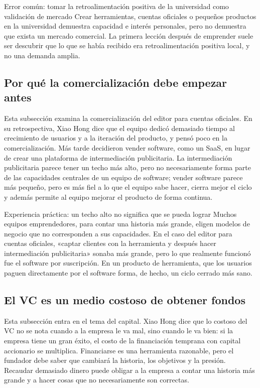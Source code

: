 \documentclass[a4paper]{article}
\begin{document}
\begin{warningbox}{Error común: tomar la retroalimentación positiva de la universidad como validación de mercado}
Crear herramientas, cuentas oficiales o pequeños productos en la universidad demuestra capacidad e interés personales, pero no demuestra que exista un mercado comercial. La primera lección después de emprender suele ser descubrir que lo que se había recibido era retroalimentación positiva local, y no una demanda amplia.
\end{warningbox}

\subsection{Por qué la comercialización debe empezar antes}

Esta subsección examina la comercialización del editor para cuentas oficiales. En su retrospectiva, Xiao Hong dice que el equipo dedicó demasiado tiempo al crecimiento de usuarios y a la iteración del producto, y pensó poco en la comercialización. Más tarde decidieron vender software, como un SaaS, en lugar de crear una plataforma de intermediación publicitaria. La intermediación publicitaria parece tener un techo más alto, pero no necesariamente forma parte de las capacidades centrales de un equipo de software; vender software parece más pequeño, pero es más fiel a lo que el equipo sabe hacer, cierra mejor el ciclo y además permite al equipo mejorar el producto de forma continua.

\begin{importantbox}{Experiencia práctica: un techo alto no significa que se pueda lograr}
Muchos equipos emprendedores, para contar una historia más grande, eligen modelos de negocio que no corresponden a sus capacidades. En el caso del editor para cuentas oficiales, «captar clientes con la herramienta y después hacer intermediación publicitaria» sonaba más grande, pero lo que realmente funcionó fue el software por suscripción. En un producto de herramienta, que los usuarios paguen directamente por el software forma, de hecho, un ciclo cerrado más sano.
\end{importantbox}

\subsection{El VC es un medio costoso de obtener fondos}

Esta subsección entra en el tema del capital. Xiao Hong dice que lo costoso del VC no se nota cuando a la empresa le va mal, sino cuando le va bien: si la empresa tiene un gran éxito, el costo de la financiación temprana con capital accionario se multiplica. Financiarse es una herramienta razonable, pero el fundador debe saber que cambiará la historia, los objetivos y la presión. Recaudar demasiado dinero puede obligar a la empresa a contar una historia más grande y a hacer cosas que no necesariamente son correctas.
\end{document}
